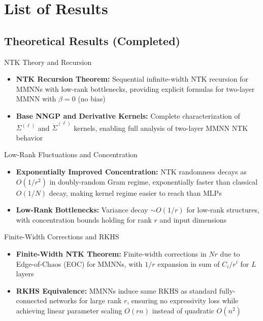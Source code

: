 \documentclass[aspectratio=169]{beamer}
\begin{document}
\section{List of Results}

\subsection{Theoretical Results (Completed)}

\begin{frame}{NTK Theory and Recursion}
\begin{itemize}
\item \textbf{NTK Recursion Theorem:} Sequential infinite-width NTK recursion for MMNNs with low-rank bottlenecks, providing explicit formulas for two-layer MMNN with $\beta=0$ (no bias)
\item \textbf{Base NNGP and Derivative Kernels:} Complete characterization of $\Sigma^{(\ell)}$ and $\dot{\Sigma}^{(\ell)}$ kernels, enabling full analysis of two-layer MMNN NTK behavior
\end{itemize}
\end{frame}

\begin{frame}{Low-Rank Fluctuations and Concentration}
\begin{itemize}
\item \textbf{Exponentially Improved Concentration:} NTK randomness decays as $O(1/r^2)$ in doubly-random Gram regime, exponentially faster than classical $O(1/N)$ decay, making kernel regime easier to reach than MLPs
\item \textbf{Low-Rank Bottlenecks:} Variance decay $\sim O(1/r)$ for low-rank structures, with concentration bounds holding for rank $r$ and input dimensions
\end{itemize}
\end{frame}

\begin{frame}{Finite-Width Corrections and RKHS}
\begin{itemize}
\item \textbf{Finite-Width NTK Theorem:} Finite-width corrections in $Nr$ due to Edge-of-Chaos (EOC) for MMNNs, with $1/r$ expansion in sum of $C_i/r^i$ for $L$ layers
\item \textbf{RKHS Equivalence:} MMNNs induce same RKHS as standard fully-connected networks for large rank $r$, ensuring no expressivity loss while achieving linear parameter scaling $O(rn)$ instead of quadratic $O(n^2)$
\end{itemize}
\end{frame}
\end{document}
